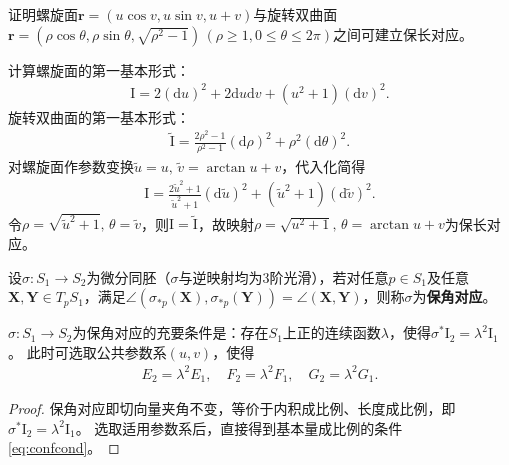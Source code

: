 \documentclass[../../main.tex]{subfiles}%
\begin{document}
\begin{example}
证明螺旋面$\boldsymbol{r}=(u\cos v,u\sin v,u+v)$与旋转双曲面$\boldsymbol{r}=(\rho\cos\theta,\rho\sin\theta,\sqrt{\rho^2-1})\,(\rho\geqslant1,0\leqslant\theta\leqslant2\pi)$之间可建立保长对应。
\begin{solution}

计算螺旋面的第一基本形式：
\begin{align*}
\mathrm{I}=2(\mathrm{d}u)^2+2\mathrm{d}u\mathrm{d}v+(u^2+1)(\mathrm{d}v)^2.
\end{align*}
旋转双曲面的第一基本形式：
\begin{align*}
\tilde{\mathrm{I}}=\frac{2\rho^2-1}{\rho^2-1}(\mathrm{d}\rho)^2+\rho^2(\mathrm{d}\theta)^2.
\end{align*}
对螺旋面作参数变换$\tilde{u}=u,\,\tilde{v}=\arctan u+v$，代入化简得
\begin{align*}
\mathrm{I}=\frac{2\tilde{u}^2+1}{\tilde{u}^2+1}(\mathrm{d}\tilde{u})^2+(\tilde{u}^2+1)(\mathrm{d}\tilde{v})^2.
\end{align*}
令$\rho=\sqrt{\tilde{u}^2+1},\,\theta=\tilde{v}$，则$\mathrm{I}=\tilde{\mathrm{I}}$，故映射$\rho=\sqrt{u^2+1},\,\theta=\arctan u+v$为保长对应。

\end{solution}
\end{example}


\begin{definition}
设$\sigma:S_1\to S_2$为微分同胚（$\sigma$与逆映射均为3阶光滑），若对任意$p\in S_1$及任意$\boldsymbol{X},\boldsymbol{Y}\in T_pS_1$，满足$\angle(\sigma_{*p}(\boldsymbol{X}),\sigma_{*p}(\boldsymbol{Y}))=\angle(\boldsymbol{X},\boldsymbol{Y})$，则称$\sigma$为\textbf{保角对应}。
\end{definition}

\begin{theorem}
$\sigma:S_1\to S_2$为保角对应的充要条件是：存在$S_1$上正的连续函数$\lambda$，使得$\sigma^*\mathrm{I}_2=\lambda^2\mathrm{I}_1$。
此时可选取公共参数系$(u,v)$，使得
\begin{align}
E_2=\lambda^2E_1,\quad F_2=\lambda^2F_1,\quad G_2=\lambda^2G_1.\label{eq:confcond}
\end{align}
\end{theorem}
\begin{proof}

保角对应即切向量夹角不变，等价于内积成比例、长度成比例，即$\sigma^*\mathrm{I}_2=\lambda^2\mathrm{I}_1$。
选取适用参数系后，直接得到基本量成比例的条件\eqref{eq:confcond}。

\end{proof}
\end{document}
